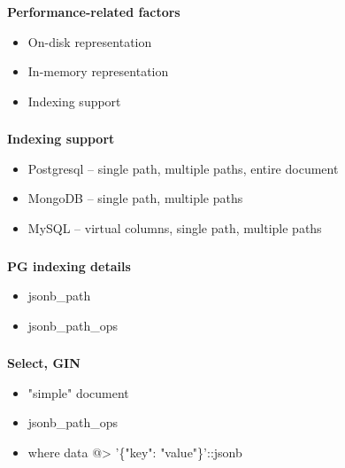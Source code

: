 \documentclass[usenames,dvipsnames, 18pt, compress, aspectratio=169]{beamer}
\begin{document}
\begin{frame}
    \frametitle{}
    \begin{center}
        \textbf{Performance-related factors}
        \pause
        \begin{itemize}[label={\MVRightarrow}]
            \item <+-> On-disk representation
            \item <+-> In-memory representation
            \item <+-> Indexing support
        \end{itemize}
    \end{center}
\end{frame}

\begin{frame}
    \frametitle{}
    \textbf{Indexing support}
    \begin{center}
        \begin{itemize}[label={\MVRightarrow}]
            \item Postgresql -- single path, multiple paths, entire document
            \item MongoDB -- single path, multiple paths
            \item MySQL -- virtual columns, single path, multiple paths
        \end{itemize}
    \end{center}
\end{frame}

\begin{frame}
    \frametitle{}
    \textbf{PG indexing details}
    \begin{center}
        \begin{itemize}[label={\MVRightarrow}]
            \item jsonb\_path
            \item jsonb\_path\_ops
        \end{itemize}
    \end{center}
\end{frame}

\begin{frame}
    \frametitle{}
    \begin{center}
        \textbf{Select, GIN}
        \begin{itemize}[label={}]
            \item "simple" document
            \item jsonb\_path\_ops
            \item where data @> '\{"key": "value"\}'::jsonb
        \end{itemize}
    \end{center}
\end{frame}
\end{document}
